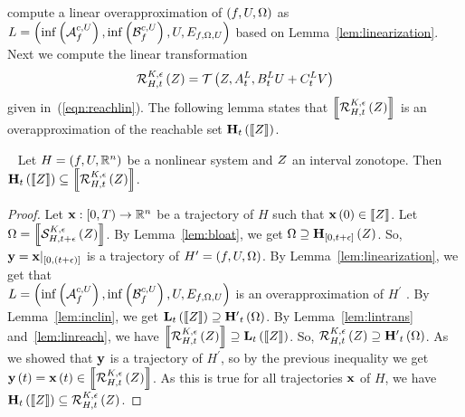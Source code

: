 compute a linear overapproximation of $\left(f,U,\Omega\right)$ as\\ $L
= \left(\inf\left(\mathcal{A}_{f}^{c,U}\right),
\inf\left(\mathcal{B}_{f}^{c,U}\right),
U,
E_{f,\Omega,U}
\right)$ based on Lemma~\ref{lem:linearization}.  Next we compute the linear transformation
%
\[
\mathcal{R}_{H,t}^{K,\epsilon}\left(Z\right)  = \mathcal{T}\left(Z,{A}^{L}_{t},{B}^{L}_{t}U + {C}^{L}_{t}V\right)
\]
%
given in~(\ref{eqn:reachlin}).  The following lemma states that
$\left\llbracket{\mathcal{R}_{H,t}^{K,\epsilon}\left(Z\right) }\right\rrbracket$ is an
overapproximation of the reachable set $\mathbf{H}_{t}\left(\left\llbracket{Z}\right\rrbracket\right)$.
%
\begin{lemma}~\label{lem:reachnonlin}
Let $H = \left(f,U,\mathbb{R}^n\right)$ be a nonlinear system and $Z$ an
interval zonotope.  Then
$\mathbf{H}_{t}\left(\left\llbracket{Z}\right\rrbracket\right) \subseteq \left\llbracket{\mathcal{R}_{H,t}^{K,\epsilon}\left(Z\right)}\right\rrbracket$.
\end{lemma}
%
\begin{proof}
Let $\mathbf{x}:[0,T)\rightarrow \mathbb{R}^n$ be a trajectory of $H$ such
that $\mathbf{x}\left(0\right)\in\left\llbracket{Z}\right\rrbracket$.  Let $\Omega
= \left\llbracket{\mathcal{S}_{H,t+\epsilon}^{K,\epsilon}\left(Z\right)}\right\rrbracket$.  By
Lemma~\ref{lem:bloat}, we get $\Omega\supseteq\mathbf{H}_{[0,t+\epsilon]}\left(Z\right)$.  So,
$\mathbf{y} = \mathbf{x}|_{[0,(t+\epsilon)]}$ is a trajectory of $H^\prime
= \left(f,U,\Omega\right)$.  By Lemma~\ref{lem:linearization}, we get that\\ $L
= \left(\inf\left(\mathcal{A}_{f}^{c,U}\right),
\inf\left(\mathcal{B}_{f}^{c,U}\right),
U,
E_{f,\Omega,U}
\right)$ is an overapproximation of $H^\prime$ .  By Lemma~\ref{lem:inclin},
we get
$\mathbf{L}_{t}\left(\left\llbracket{Z}\right\rrbracket\right)\supseteq\mathbf{H^\prime}_{t}\left(\Omega\right)$.  By
Lemma~\ref{lem:lintrans} and~\ref{lem:linreach}, we have
$\left\llbracket{\mathcal{R}_{H,t}^{K,\epsilon}\left(Z\right)}\right\rrbracket \supseteq \mathbf{L}_{t}\left(\left\llbracket{Z}\right\rrbracket\right)$.
So,
$\mathcal{R}_{H,t}^{K,\epsilon}\left(Z\right)\supseteq\mathbf{H^\prime}_{t}\left(\Omega\right)$.
As we showed that $\mathbf{y}$ is a trajectory of $H^\prime$, so by the previous
inequality we get $\mathbf{y}\left(t\right)
= \mathbf{x}\left(t\right)\in\left\llbracket{\mathcal{R}_{H,t}^{K,\epsilon}\left(Z\right)}\right\rrbracket$.  As this is true
for all trajectories $\mathbf{x}$ of $H$, we have
$\mathbf{H}_{t}\left(\left\llbracket{Z}\right\rrbracket\right)\subseteq\mathcal{R}_{H,t}^{K,\epsilon}\left(Z\right)$.
\end{proof}
%
